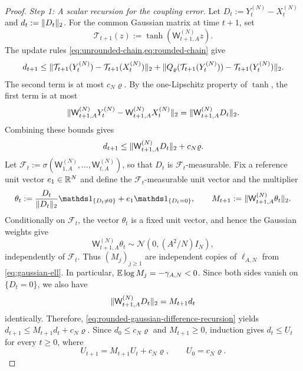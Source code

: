 \documentclass[11pt,reqno,a4paper]{article}
\newcommand{\Ee}{\E}
\begin{document}
\begin{proof}
  \emph{Step 1: A scalar recursion for the coupling error.}
  Let $D_t:=Y_t^{(N)}-X_t^{(N)}$ and $d_t:=\lVert D_t\rVert_2$.
  For the common Gaussian matrix at time $t+1$, set
  \begin{equation*}
    \mathcal T_{t+1}(z)
    :=
    \tanh\left(\mathsf W_{t+1,A}^{(N)}z\right).
  \end{equation*}
  The update rules \cref{eq:unrounded-chain,eq:rounded-chain} give
  \begin{equation*}
    d_{t+1}
    \leq
    \lVert\mathcal T_{t+1}(Y_t^{(N)})-
      \mathcal T_{t+1}(X_t^{(N)})\rVert_2
    +\lVert Q_\varrho(\mathcal T_{t+1}(Y_t^{(N)}))-
      \mathcal T_{t+1}(Y_t^{(N)})\rVert_2.
  \end{equation*}
  The second term is at most $c_N\varrho$. By the one-Lipschitz property of
  $\tanh$, the first term is at most
  \begin{equation*}
    \lVert
      \mathsf W_{t+1,A}^{(N)}Y_t^{(N)}
      -
      \mathsf W_{t+1,A}^{(N)}X_t^{(N)}
    \rVert_2
    =
    \lVert\mathsf W_{t+1,A}^{(N)}D_t\rVert_2 .
  \end{equation*}
  Combining these bounds gives
  \begin{equation}\label{eq:rounded-gaussian-difference-recursion}
    d_{t+1}
    \leq
    \lVert\mathsf W_{t+1,A}^{(N)}D_t\rVert_2+c_N\varrho .
  \end{equation}
  Let $\mathcal F_t:=\sigma(\mathsf W_{1,A}^{(N)},\ldots,\mathsf W_{t,A}^{(N)})$,
  so that $D_t$ is $\mathcal F_t$-measurable. Fix a reference unit vector
  $e_1\in\mathbb{R}^N$ and define the $\mathcal F_t$-measurable unit vector and the
  multiplier
  \begin{equation*}
    \theta_t
    :=
    \frac{D_t}{\norm{D_t}_2}\one_{\{D_t\neq0\}}+e_1\one_{\{D_t=0\}},
    \qquad
    M_{t+1}:=\norm{\mathsf W_{t+1,A}^{(N)}\theta_t}_2 .
  \end{equation*}
  Conditionally on $\mathcal F_t$, the vector $\theta_t$ is a fixed unit vector,
  and hence the Gaussian weights give
  \begin{equation*}
    \mathsf W_{t+1,A}^{(N)}\theta_t
    \sim
    \mathcal N(0,(A^2/N)I_N),
  \end{equation*}
  independently of $\mathcal F_t$. Thus $(M_j)_{j\geq1}$ are independent
  copies of $\ell_{A,N}$ from \cref{eq:gaussian-ell}. In particular,
  $\Ee\log M_j=-\gamma_{A,N}<0$. Since both sides vanish on $\{D_t=0\}$,
  we also have
  \begin{equation*}
    \lVert\mathsf W_{t+1,A}^{(N)}D_t\rVert_2=M_{t+1}d_t
  \end{equation*}
  identically. Therefore, \cref{eq:rounded-gaussian-difference-recursion}
  yields $d_{t+1}\leq M_{t+1}d_t+c_N\varrho$. Since
  $d_0\leq c_N\varrho$ and $M_{t+1}\geq0$, induction gives $d_t\leq U_t$ for
  every $t\geq0$, where
  \begin{equation}\label{eq:rounded-gaussian-scalar-error-recursion}
    U_{t+1}=M_{t+1}U_t+c_N\varrho,
    \qquad
    U_0=c_N\varrho .
  \end{equation}


\end{proof}
\end{document}
